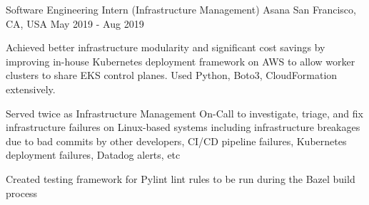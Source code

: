 \begin{cventries}
  \cventry
  {Software Engineering Intern (Infrastructure Management)} %
    {Asana} %
    {San Francisco, CA, USA} %
    {May 2019 - Aug 2019} %
    {
      \begin{cvitems} %
      \item {Achieved better infrastructure modularity and significant cost savings by improving in-house Kubernetes deployment framework on AWS to allow worker clusters to share EKS control planes. Used Python, Boto3, CloudFormation extensively.}
      \item {Served twice as Infrastructure Management On-Call to investigate, triage, and fix infrastructure failures on Linux-based systems including infrastructure breakages due to bad commits by other developers, CI/CD pipeline failures, Kubernetes deployment failures, Datadog alerts, etc}
      \item {Created testing framework for Pylint lint rules to be run during the Bazel build process}
      \end{cvitems}
    }


\end{cventries}

